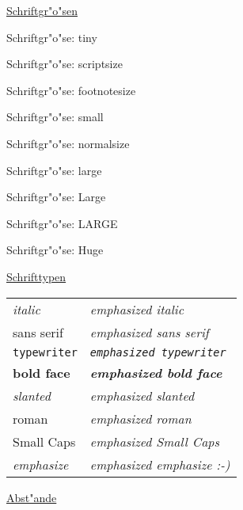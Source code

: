 \documentclass[11pt,twocolumn,vertical]{book}
\begin{document}
\hrulefill

\underline{Schriftgr"o"sen}

{\tiny Schriftgr"o"se: tiny}

{\scriptsize Schriftgr"o"se: scriptsize}

{\footnotesize Schriftgr"o"se: footnotesize}

{\small Schriftgr"o"se: small}

{\normalsize Schriftgr"o"se: normalsize}

{\large Schriftgr"o"se: large}

{\Large Schriftgr"o"se: Large}

{\LARGE Schriftgr"o"se: LARGE}

{\Huge Schriftgr"o"se: Huge}



\hrulefill

\underline{Schrifttypen}

\begin{tabular}[t]{ll}

{\it italic} & {\it\em emphasized italic} \\

{\sf sans serif} & {\sf\em emphasized sans serif} \\

{\tt typewriter} & {\tt\em emphasized typewriter} \\

{\bf bold face} & {\bf\em emphasized bold face} \\

{\sl slanted} & {\sl\em emphasized slanted} \\

{\rm roman} & {\rm\em emphasized roman} \\

{\sc Small Caps} & {\sc\em emphasized Small Caps} \\

{\em emphasize} & {\em\em emphasized emphasize :-) } \\

\end{tabular}


\hrulefill

\underline{Abst"ande}
\end{document}
